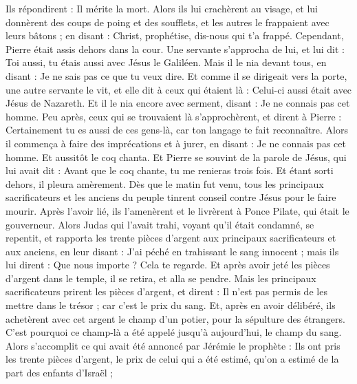 \begin{multicols}{2}
Ils répondirent : Il mérite la mort.
Alors ils lui crachèrent au visage, et lui donnèrent des coups de poing et des soufflets, et les autres le frappaient avec leurs bâtons ;
en disant : Christ, prophétise, dis-nous qui t’a frappé.
Cependant, Pierre était assis dehors dans la cour. Une servante s'approcha de lui, et lui dit : Toi aussi, tu étais aussi avec Jésus le Galiléen.
Mais il le nia devant tous, en disant : Je ne sais pas ce que tu veux dire.
Et comme il se dirigeait vers la porte, une autre servante le vit, et elle dit à ceux qui étaient là : Celui-ci aussi était avec Jésus de Nazareth.
Et il le nia encore avec serment, disant : Je ne connais pas cet homme.
Peu après, ceux qui se trouvaient là s'approchèrent, et dirent à Pierre : Certainement tu es aussi de ces gens-là, car ton langage te fait reconnaître.
Alors il commença à faire des imprécations et à jurer, en disant : Je ne connais pas cet homme. Et aussitôt le coq chanta.
Et Pierre se souvint de la parole de Jésus, qui lui avait dit : Avant que le coq chante, tu me renieras trois fois. Et étant sorti dehors, il pleura amèrement.
\VerseOne{}Dès que le matin fut venu, tous les principaux sacrificateurs et les anciens du peuple tinrent conseil contre Jésus pour le faire mourir.
Après l’avoir lié, ils l'amenèrent et le livrèrent à Ponce Pilate, qui était le gouverneur.
Alors Judas qui l'avait trahi, voyant qu'il était condamné, se repentit, et rapporta les trente pièces d'argent aux principaux sacrificateurs et aux anciens,
en leur disant : J’ai péché en trahissant le sang innocent ; mais ils lui dirent : Que nous importe ? Cela te regarde.
Et après avoir jeté les pièces d'argent dans le temple, il se retira, et alla se pendre.
Mais les principaux sacrificateurs prirent les pièces d'argent, et dirent : Il n'est pas permis de les mettre dans le trésor ; car c’est le prix du sang.
Et, après en avoir délibéré, ils achetèrent avec cet argent le champ d'un potier, pour la sépulture des étrangers.
C'est pourquoi ce champ-là a été appelé jusqu'à aujourd'hui, le champ du sang.
Alors s’accomplit ce qui avait été annoncé par Jérémie le prophète : Ils ont pris les trente pièces d'argent, le prix de celui qui a été estimé, qu’on a estimé de la part des enfants d'Israël ;

\end{multicols}
